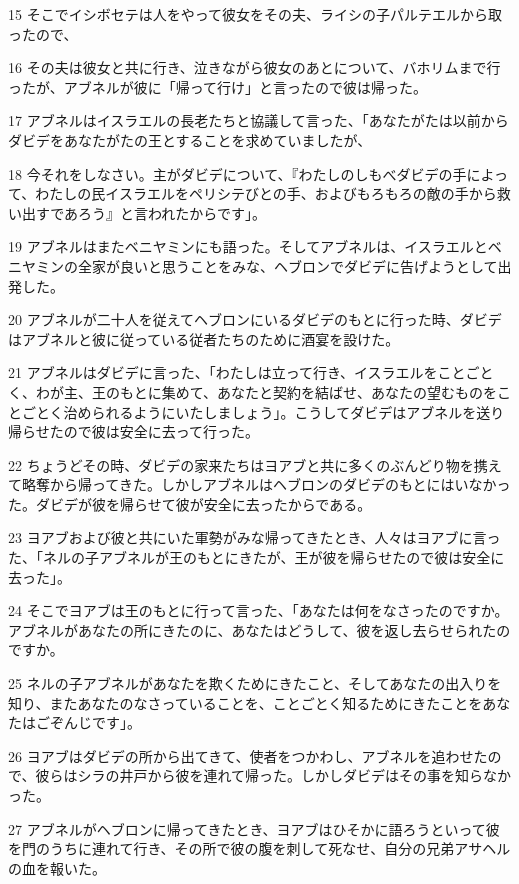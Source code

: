 \par 15 そこでイシボセテは人をやって彼女をその夫、ライシの子パルテエルから取ったので、
\par 16 その夫は彼女と共に行き、泣きながら彼女のあとについて、バホリムまで行ったが、アブネルが彼に「帰って行け」と言ったので彼は帰った。
\par 17 アブネルはイスラエルの長老たちと協議して言った、「あなたがたは以前からダビデをあなたがたの王とすることを求めていましたが、
\par 18 今それをしなさい。主がダビデについて、『わたしのしもべダビデの手によって、わたしの民イスラエルをペリシテびとの手、およびもろもろの敵の手から救い出すであろう』と言われたからです」。
\par 19 アブネルはまたベニヤミンにも語った。そしてアブネルは、イスラエルとベニヤミンの全家が良いと思うことをみな、ヘブロンでダビデに告げようとして出発した。
\par 20 アブネルが二十人を従えてヘブロンにいるダビデのもとに行った時、ダビデはアブネルと彼に従っている従者たちのために酒宴を設けた。
\par 21 アブネルはダビデに言った、「わたしは立って行き、イスラエルをことごとく、わが主、王のもとに集めて、あなたと契約を結ばせ、あなたの望むものをことごとく治められるようにいたしましょう」。こうしてダビデはアブネルを送り帰らせたので彼は安全に去って行った。
\par 22 ちょうどその時、ダビデの家来たちはヨアブと共に多くのぶんどり物を携えて略奪から帰ってきた。しかしアブネルはヘブロンのダビデのもとにはいなかった。ダビデが彼を帰らせて彼が安全に去ったからである。
\par 23 ヨアブおよび彼と共にいた軍勢がみな帰ってきたとき、人々はヨアブに言った、「ネルの子アブネルが王のもとにきたが、王が彼を帰らせたので彼は安全に去った」。
\par 24 そこでヨアブは王のもとに行って言った、「あなたは何をなさったのですか。アブネルがあなたの所にきたのに、あなたはどうして、彼を返し去らせられたのですか。
\par 25 ネルの子アブネルがあなたを欺くためにきたこと、そしてあなたの出入りを知り、またあなたのなさっていることを、ことごとく知るためにきたことをあなたはごぞんじです」。
\par 26 ヨアブはダビデの所から出てきて、使者をつかわし、アブネルを追わせたので、彼らはシラの井戸から彼を連れて帰った。しかしダビデはその事を知らなかった。
\par 27 アブネルがヘブロンに帰ってきたとき、ヨアブはひそかに語ろうといって彼を門のうちに連れて行き、その所で彼の腹を刺して死なせ、自分の兄弟アサヘルの血を報いた。
